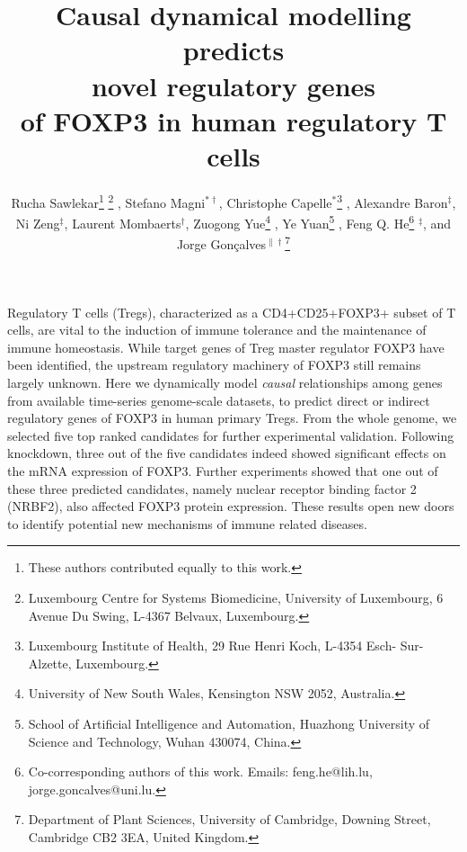 \documentclass[oneside, 10pt, a4paper, twocolumn]{article}
\begin{document}

\title{Causal dynamical modelling predicts \\ novel regulatory genes \\ of FOXP3 in human regulatory T cells}
\date{}
\author{Rucha Sawlekar\thanks{These authors contributed equally to this work.} \thanks{Luxembourg Centre for Systems Biomedicine, University of Luxembourg, 6 Avenue Du Swing, L-4367 Belvaux, Luxembourg.} , Stefano Magni$^{*\dagger}$, Christophe Capelle$^{*}$\thanks{Luxembourg Institute of Health, 29 Rue Henri Koch, L-4354 Esch- Sur-Alzette, Luxembourg.} , Alexandre Baron$ ^{\ddagger} $, Ni Zeng$ ^{\ddagger} $, Laurent Mombaerts$ ^{\dagger} $,  Zuogong Yue\thanks{University of New South Wales, Kensington NSW 2052, Australia.} , Ye Yuan\thanks{School of Artificial Intelligence and Automation, Huazhong University of Science and Technology, Wuhan 430074, China.} , Feng Q. He\thanks{Co-corresponding authors of this work. Emails: feng.he@lih.lu, jorge.goncalves@uni.lu.} $ ^{\ddagger} $, and Jorge Gon\c{c}alves$ ^{\|\dagger}$\thanks{Department of Plant Sciences, University of Cambridge, Downing Street, Cambridge CB2 3EA, United Kingdom.}
}
\maketitle

\newpage

\hypersetup{
      linkcolor = blue %
}


\abstract   %
Regulatory T cells (Tregs), characterized as a CD4+CD25+FOXP3+ subset of T cells, are vital to the induction of immune tolerance and the maintenance of immune homeostasis. While target genes of Treg master regulator FOXP3 have been identified, the upstream regulatory machinery of FOXP3 still remains largely unknown. Here we dynamically model {\em causal} relationships among genes from available time-series genome-scale datasets, to predict direct or indirect regulatory genes of FOXP3 in human primary Tregs. From the whole genome, we selected five top ranked candidates for further experimental validation. Following knockdown, three out of the five candidates indeed showed significant effects on the mRNA expression of FOXP3. Further experiments showed that one out of these three predicted candidates, namely nuclear receptor binding factor 2 (NRBF2), also affected FOXP3 protein expression. These results 
open new doors to identify potential new mechanisms of immune related diseases.
\end{document}
